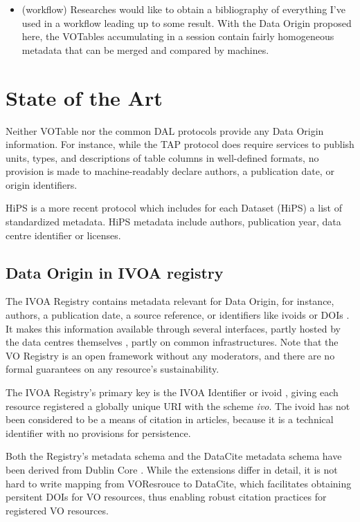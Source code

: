 \documentclass[11pt,a4paper]{ivoa}
\begin{document}
\begin{itemize}
	\item (workflow) Researches would like to obtain a bibliography of everything I've used in a workflow leading up to some result.
	With the Data Origin proposed here, the VOTables accumulating in a session contain fairly homogeneous metadata that can be merged and compared by machines.
	
\end{itemize}

\section{State of the Art}
\label{sect:stateoftheart}

Neither VOTable \citep{2019ivoa.spec.1021O} nor the common DAL protocols provide any Data Origin information. For instance, while the TAP protocol \citep{2019ivoa.spec.0927D} does require services to publish units, types, and descriptions of table columns in well-defined formats, no provision is made to machine-readably declare authors, a publication date, or origin identifiers.

HiPS \citep{2017ivoa.spec.0519F} is a more recent protocol which includes for each Dataset (HiPS) a list of standardized metadata. HiPS metadata include authors, publication year, data centre identifier or licenses.


\subsection{Data Origin in IVOA registry}
The IVOA Registry contains metadata relevant for Data Origin, for instance, authors, a publication date, a source reference, or identifiers like ivoids or DOIs \citep{2018ivoa.spec.0625P}.
It makes this information available through several interfaces, partly
hosted by the data centres themselves \citep{2017ivoa.spec.0524G}, partly on common
infrastructures.
Note that the VO Registry is an open framework without any moderators, and
there are no formal guarantees on any
resource's sustainability.

The IVOA Registry's primary key is the IVOA Identifier or ivoid  \citep{2016ivoa.spec.0523D}, giving each resource registered a globally unique URI with the scheme \emph{ivo}.  The ivoid has not been considered to be a means of citation in articles, because it is a technical identifier with no provisions for persistence.

Both the Registry's metadata schema and the DataCite
\citep{std:DataCite40} metadata schema have been
derived from Dublin Core \citep{std:DUBLINCORE}.  While the extensions differ in detail, it is not
hard to write mapping from VOResrouce to DataCite, which facilitates
obtaining persitent DOIs for VO resources, thus enabling robust citation practices for registered VO resources.
\end{document}
